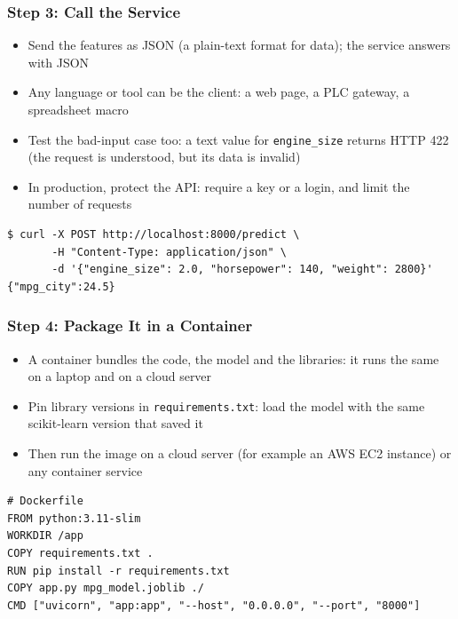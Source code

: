 \begin{frame}[fragile]\frametitle{Step 3: Call the Service}
\begin{itemize}
\item Send the features as JSON (a plain-text format for data); the service answers with JSON
\item Any language or tool can be the client: a web page, a PLC gateway, a spreadsheet macro
\item Test the bad-input case too: a text value for \texttt{engine\_size} returns HTTP 422 (the request is understood, but its data is invalid)
\item In production, protect the API: require a key or a login, and limit the number of requests
\end{itemize}
\begin{lstlisting}
$ curl -X POST http://localhost:8000/predict \
       -H "Content-Type: application/json" \
       -d '{"engine_size": 2.0, "horsepower": 140, "weight": 2800}'
{"mpg_city":24.5}
\end{lstlisting}
\end{frame}

\begin{frame}[fragile]\frametitle{Step 4: Package It in a Container}
\begin{itemize}
\item A container bundles the code, the model and the libraries: it runs the same on a laptop and on a cloud server
\item Pin library versions in \texttt{requirements.txt}: load the model with the same scikit-learn version that saved it
\item Then run the image on a cloud server (for example an AWS EC2 instance) or any container service
\end{itemize}
\begin{lstlisting}
# Dockerfile
FROM python:3.11-slim
WORKDIR /app
COPY requirements.txt .
RUN pip install -r requirements.txt
COPY app.py mpg_model.joblib ./
CMD ["uvicorn", "app:app", "--host", "0.0.0.0", "--port", "8000"]
\end{lstlisting}
\end{frame}


